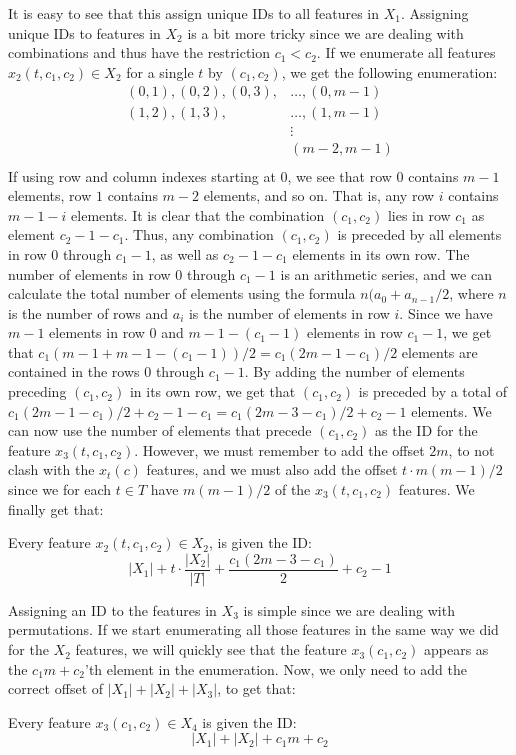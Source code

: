 It is easy to see that this assign unique IDs to all features in $X_1$.
Assigning unique IDs to features in $X_2$ is a bit more tricky since we are dealing with combinations and thus have the restriction $c_1 < c_2$.
If we enumerate all features $x_2(t, c_1, c_2) \in X_2$ for a single $t$ by $(c_1, c_2)$, we get the following enumeration:
\begin{align*}
(0, 1), (0, 2), (0, 3),& \dots, (0, m-1)\\
        (1, 2), (1, 3),& \dots, (1, m-1)\\
                        & \vdots    \\
                         &      (m-2, m-1)\\                   
\end{align*}
If using row and column indexes starting at $0$, we see that row $0$ contains $m-1$ elements, row $1$ contains $m-2$ elements, and so on.
That is, any row $i$ contains $m-1-i$ elements.
It is clear that the combination $(c_1, c_2)$ lies in row $c_1$ as element $c_2 - 1 - c_1$.
Thus, any combination $(c_1, c_2)$ is preceded by all elements in row $0$ through $c_1 - 1$, as well as $c_2 - 1 - c_1$ elements in its own row.
The number of elements in row $0$ through $c_1 - 1$ is an arithmetic series, and we can calculate the total number of elements
using the formula $n(a_0 + a_{n-1}/2$, where $n$ is the number of rows and $a_i$ is the number of elements in row $i$.
Since we have $m-1$ elements in row $0$ and $m - 1 - (c_1 - 1)$ elements in row $c_1 - 1$,
we get that $c_1(m-1 + m-1-(c_1-1))/2 = c_1(2m-1-c_1)/2$ elements are contained in the rows $0$ through $c_1 - 1$.
By adding the number of elements preceding $(c_1, c_2)$ in its own row, we get that $(c_1, c_2)$ is preceded by a total of
$c_1(2m-1-c_1)/2 + c_2-1-c_1 = c_1(2m-3-c_1)/2 + c_2-1$ elements.
We can now use the number of elements that precede $(c_1, c_2)$ as the ID for the feature $x_3(t, c_1, c_2)$. However, we must remember to add the offset $2m$, to not clash with the $x_t(c)$ features, and we must also add the offset $t \cdot m(m-1)/2$ since we for each $t \in T$ have $m(m-1)/2$ of the $x_3(t, c_1, c_2)$ features.
We finally get that:

\begin{center}
Every feature $x_2(t, c_1, c_2) \in X_2$, is given the ID:
\[ |X_1| + t \cdot \frac{|X_2|}{|T|} + \frac{c_1(2m-3-c_1)}{2} + c_2-1\]
\end{center}

Assigning an ID to the features in $X_3$ is simple since we are dealing with permutations. If we start enumerating all those features in the same way we did for the $X_2$ features, we will quickly see that the feature $x_3(c_1, c_2)$ appears as the $c_1m+c_2$'th element in the enumeration.
Now, we only need to add the correct offset of $|X_1| + |X_2| + |X_3|$, to get that:
\begin{center}
Every feature $x_3(c_1, c_2) \in X_4$ is given the ID:
\[|X_1| + |X_2| + c_1m+c_2\]
\end{center}